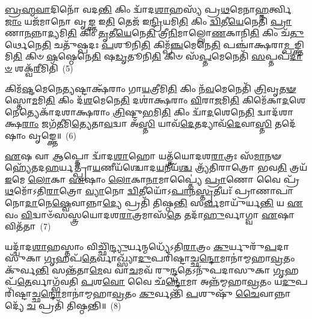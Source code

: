 \-\ul{𑌬𑍍𑌰}\-\-\ul{𑌹𑍍𑌮}\-\-\ul{𑌵𑌾}\-𑌦𑌿𑌨𑍋᳴ 𑌵𑌦\-\ul{𑌨𑍍𑌤𑌿} 𑌕𑌿𑌂 𑌦𑍍𑌵𑌾᳴𑌦\-\ul{𑌶𑌾}\-𑌹𑌸𑍍𑌯᳴ 𑌪𑍍𑌰\-\ul{𑌥}\-𑌮𑍇𑌨𑌾\-\ul{𑌹𑍍𑌨}\-𑌰𑍍𑌤𑍍𑌵𑌿\-\ul{𑌜𑌾𑌂} 𑌯𑌜᳴𑌮𑌾𑌨𑍋 𑌵𑍃\-\ul{𑌙𑍍𑌕𑍍𑌤} 𑌇\-\ul{𑌤𑌿} 𑌤𑍇𑌜᳴ 𑌇\-\ul{𑌨𑍍𑌦𑍍𑌰𑌿}\-𑌯𑌮𑌿\-\ul{𑌤𑌿} 𑌕𑌿𑌂 \ul{𑌦𑍍𑌵𑌿}\-𑌤𑍀\-\ul{𑌯𑍇}\-𑌨𑍇𑌤𑌿᳴ \ul{𑌪𑍍𑌰𑌾}\-𑌣𑌾\-\ul{𑌨}\-𑌨𑍍𑌨𑌾\-\ul{𑌦𑍍𑌯}\-𑌮𑌿\-\ul{𑌤𑌿} 𑌕𑌿𑌂 \ul{𑌤𑍃}\-𑌤𑍀\-\ul{𑌯𑍇}\-𑌨𑍇\-\ul{𑌤𑌿} 𑌤𑍍𑌰𑍀\-\ul{𑌨𑌿}\-𑌮𑌾𑌲𑍍𑌲𑍋\-\ul{𑌣}\-𑌕𑌾𑌨𑌿\-\ul{𑌤𑌿} 𑌕𑌿𑌂 𑌚᳴\-\ul{𑌤𑍁}\-𑌰𑍍𑌥𑍇𑌨𑍇\-\ul{𑌤𑌿} 𑌚𑌤𑍁᳴𑌷𑍍𑌪𑌦𑌃 \ul{𑌪}\-𑌶𑍂𑌨𑌿\-\ul{𑌤𑌿} 𑌕𑌿𑌮𑍍𑌪᳴\-\ul{𑌞𑍍𑌚}\-𑌮𑍇𑌨𑍇\-\ul{𑌤𑌿} 𑌪𑌞𑍍𑌚𑌾॑𑌕𑍍𑌷𑌰𑌾\-\ul{𑌮𑍍𑌪}\-𑌙𑍍𑌕𑍍𑌤𑌿𑌮𑌿\-\ul{𑌤𑌿} 𑌕𑌿𑍞 \ul{𑌷}\-𑌷𑍍𑌠𑍇𑌨𑍇\-\ul{𑌤𑌿} 𑌷\-\ul{𑌡𑍃}\-𑌤𑍂𑌨𑌿\-\ul{𑌤𑌿} 𑌕𑌿𑍞 𑌸᳴\-\ul{𑌪𑍍𑌤}\-𑌮𑍇𑌨𑍇𑌤𑌿᳴ \ul{𑌸}\-𑌪𑍍𑌤𑌪᳴\-\ul{𑌦𑌾}\-\-\ul{𑍞} 𑌶𑌕𑍍𑌵᳴\-\ul{𑌰𑍀}\-𑌮𑌿𑌤𑌿᳴~(5)

𑌕𑌿𑌮᳴\-\ul{𑌷𑍍𑌟}\-𑌮𑍇𑌨𑍇\-\ul{𑌤𑍍𑌯}\-𑌷𑍍𑌟𑌾𑌕𑍍𑌷᳴𑌰𑌾𑌂 𑌗𑌾\-\ul{𑌯}\-𑌤𑍍𑌰𑍀𑌮𑌿\-\ul{𑌤𑌿} 𑌕𑌿𑌂 𑌨᳴\-\ul{𑌵}\-𑌮𑍇𑌨𑍇𑌤𑌿᳴ \ul{𑌤𑍍𑌰𑌿}\-𑌵𑍃\-\ul{𑌤}\-\-\ul{𑍟} 𑌸𑍍𑌤𑍋\-\ul{𑌮}\-𑌮𑌿\-\ul{𑌤𑌿} 𑌕𑌿𑌂 𑌦᳴\-\ul{𑌶}\-𑌮𑍇𑌨𑍇\-\ul{𑌤𑌿} 𑌦𑌶𑌾॑𑌕𑍍𑌷𑌰𑌾𑌂 \ul{𑌵𑌿}\-𑌰𑌾\-\ul{𑌜}\-𑌮𑌿\-\ul{𑌤𑌿} 𑌕𑌿𑌮𑍇᳴𑌕𑌾\-\ul{𑌦}\-𑌶𑍇𑌨𑍇𑌤𑍍𑌯𑍇𑌕𑌾᳴\-𑌦𑌶𑌾𑌕𑍍𑌷𑌰𑌾𑌂 \ul{𑌤𑍍𑌰𑌿}\-𑌷𑍍𑌟𑍁\-\ul{𑌭}\-𑌮𑌿\-\ul{𑌤𑌿} 𑌕𑌿𑌂 𑌦𑍍𑌵𑌾᳴\-\ul{𑌦}\-𑌶𑍇𑌨𑍇\-\ul{𑌤𑌿} 𑌦𑍍𑌵𑌾𑌦᳴𑌶𑌾𑌕𑍍𑌷\-\ul{𑌰𑌾𑌂} 𑌜𑌗᳴\-\ul{𑌤𑍀}\-𑌮𑌿\-\ul{𑌤𑍍𑌯𑍇}\-𑌤𑌾\-\ul{𑌵}\-𑌦𑍍𑌵𑌾 𑌅᳴\-\ul{𑌸𑍍𑌤𑌿} 𑌯𑌾𑌵᳴\-\ul{𑌦𑍇}\-𑌤𑌦𑍍𑌯𑌾𑌵᳴\-\ul{𑌦𑍇}\-𑌵𑌾\-\ul{𑌸𑍍𑌤𑌿} 𑌤𑌦𑍇᳴𑌷𑌾𑌂 𑌵𑍃𑌙𑍍𑌕𑍍𑌤𑍇॥~(6)

{\anuvakamend[{𑌶𑌕𑍍𑌵᳴\-\ul{𑌰𑍀}\-𑌮𑌿𑌤𑍍𑌯𑍇𑌕᳴𑌚𑌤𑍍𑌵𑌾𑌰𑌿𑍞𑌶𑌚𑍍𑌚}]}%

\-\ul{𑌏}\-𑌷 𑌵𑌾 \ul{𑌆}\-𑌪𑍍𑌤𑍋 𑌦𑍍𑌵𑌾᳴𑌦\-\ul{𑌶𑌾}\-𑌹𑍋 𑌯𑌤𑍍𑌤𑍍𑌰᳴𑌯𑍋𑌦𑌶\-\ul{𑌰𑌾}\-𑌤𑍍𑌰𑌃 𑌸᳴\-\ul{𑌮𑌾}\-𑌨𑍟 𑌹𑍍𑌯𑍇᳴𑌤𑌦\-\ul{𑌹}\-𑌰𑍍𑌯𑌤𑍍𑌪𑍍𑌰𑌾᳴\-\ul{𑌯}\-𑌣𑍀𑌯᳴𑌶𑍍𑌚𑍋𑌦\-\ul{𑌯}\-𑌨𑍀𑌯᳴\-\ul{𑌶𑍍𑌚} 𑌤𑍍𑌰𑍍𑌯᳴𑌤𑌿𑌰𑌾𑌤𑍍𑌰𑍋 𑌭𑌵\-\ul{𑌤𑌿} 𑌤𑍍𑌰𑌯᳴ \ul{𑌇}\-𑌮𑍇 \ul{𑌲𑍋}\-𑌕𑌾 \ul{𑌏}\-𑌷𑌾𑌂 \ul{𑌲𑍋}\-𑌕𑌾\-\ul{𑌨𑌾}\-𑌮𑌾𑌪𑍍𑌤𑍍𑌯𑍈॑ \ul{𑌪𑍍𑌰𑌾}\-𑌣𑍋 𑌵𑍈 𑌪𑍍𑌰᳴\-\ul{𑌥}\-𑌮𑍋᳴\-𑌽𑌤𑌿\-\ul{𑌰𑌾}\-𑌤𑍍𑌰𑍋 \ul{𑌵𑍍𑌯𑌾}\-𑌨𑍋 \ul{𑌦𑍍𑌵𑌿}\-𑌤𑍀𑌯𑍋᳴\-𑌽\-\ul{𑌪𑌾}\-𑌨\-\ul{𑌸𑍍𑌤𑍃}\-𑌤𑍀𑌯𑌃᳴ 𑌪𑍍𑌰𑌾𑌣𑌾𑌪𑌾𑌨𑍋\-\ul{𑌦𑌾}\-𑌨𑍇\-\ul{𑌷𑍍𑌵𑍇}\-𑌵𑌾𑌨𑍍𑌨𑌾\-\ul{𑌦𑍍𑌯𑍇} 𑌪𑍍𑌰𑌤𑌿᳴ 𑌤𑌿𑌷𑍍𑌠\-\ul{𑌨𑍍𑌤𑌿} 𑌸\-\ul{𑌰𑍍𑌵}\-𑌮𑌾𑌯𑍁᳴𑌰𑍍𑌯\-\ul{𑌨𑍍𑌤𑌿} 𑌯 \ul{𑌏}\-𑌵𑌂 \ul{𑌵𑌿}\-𑌦𑍍𑌵𑌾𑍞᳴𑌸𑌸𑍍𑌤𑍍𑌰𑌯𑍋𑌦𑌶\-\ul{𑌰𑌾}\-𑌤𑍍𑌰𑌮𑌾𑌸᳴\-\ul{𑌤𑍇} 𑌤𑌦𑌾᳴\-\ul{𑌹𑍁}\-𑌰𑍍𑌵𑌾𑌗𑍍𑌵𑌾 \ul{𑌏}\-𑌷𑌾 𑌵𑌿𑌤᳴𑌤𑌾~(7)

𑌯𑌦𑍍𑌦𑍍𑌵𑌾᳴𑌦\-\ul{𑌶𑌾}\-𑌹𑌸𑍍𑌤𑌾𑌂 𑌵𑌿𑌚𑍍𑌛𑌿᳴\-\ul{𑌨𑍍𑌦𑍍𑌯𑍁}\-𑌰𑍍𑌯𑌨𑍍𑌮𑌧𑍍𑌯𑍇᳴\-𑌽𑌤𑌿\-\ul{𑌰𑌾}\-𑌤𑍍𑌰𑌂 \ul{𑌕𑍁}\-𑌰𑍍𑌯𑍁𑌰𑍁᳴\-\ul{𑌪}\-𑌦𑌾𑌸𑍁᳴𑌕𑌾 \ul{𑌗𑍃}\-𑌹𑌪᳴\-\ul{𑌤𑍇}\-𑌰𑍍𑌵𑌾𑌖𑍍𑌸𑍍𑌯𑌾᳴\-\ul{𑌦𑍁}\-𑌪𑌰𑌿᳴𑌷𑍍𑌟𑌾𑌚𑍍𑌛\-\ul{𑌨𑍍𑌦𑍋}\-𑌮𑌾𑌨𑌾॑𑌮𑍍𑌮𑌹𑌾\-\ul{𑌵𑍍𑌰}\-𑌤𑌂 𑌕𑍁᳴𑌰𑍍𑌵\-\ul{𑌨𑍍𑌤𑌿} 𑌸𑌨𑍍𑌤᳴𑌤𑌾\-\ul{𑌮𑍇}\-𑌵 𑌵𑌾\-\ul{𑌚}\-𑌮𑌵᳴ 𑌰𑍁\-\ul{𑌨𑍍𑌦𑍍𑌧}\-𑌤𑍇\-𑌽𑌨𑍁᳴𑌪𑌦𑌾𑌸𑍁𑌕𑌾 \ul{𑌗𑍃}\-𑌹𑌪᳴\-\ul{𑌤𑍇}\-𑌰𑍍𑌵𑌾𑌗𑍍𑌭᳴𑌵𑌤𑌿 \ul{𑌪}\-𑌶\-\ul{𑌵𑍋} 𑌵𑍈 𑌛᳴\-\ul{𑌨𑍍𑌦𑍋}\-𑌮𑌾 𑌅𑌨𑍍𑌨᳴𑌮𑍍𑌮𑌹𑌾\-\ul{𑌵𑍍𑌰}\-𑌤𑌂 𑌯\-\ul{𑌦𑍁}\-𑌪𑌰𑌿᳴𑌷𑍍𑌟𑌾𑌚𑍍𑌛\-\ul{𑌨𑍍𑌦𑍋}\-𑌮𑌾𑌨𑌾॑\-𑌮𑍍𑌮𑌹𑌾\-\ul{𑌵𑍍𑌰}\-𑌤𑌂 \ul{𑌕𑍁}\-𑌰𑍍𑌵𑌨𑍍𑌤𑌿᳴ \ul{𑌪}\-𑌶𑍁𑌷𑍁᳴ \ul{𑌚𑍈}\-𑌵𑌾𑌨𑍍𑌨𑌾𑌦𑍍𑌯𑍇᳴ \ul{𑌚} 𑌪𑍍𑌰𑌤𑌿᳴ 𑌤𑌿𑌷𑍍𑌠𑌨𑍍𑌤𑌿॥~(8)

{\anuvakamend[{𑌵𑌿𑌤᳴\-\ul{𑌤𑌾} 𑌤𑍍𑌰𑌿𑌚᳴𑌤𑍍𑌵𑌾𑌰𑌿𑍞𑌶𑌚𑍍𑌚}]}%

